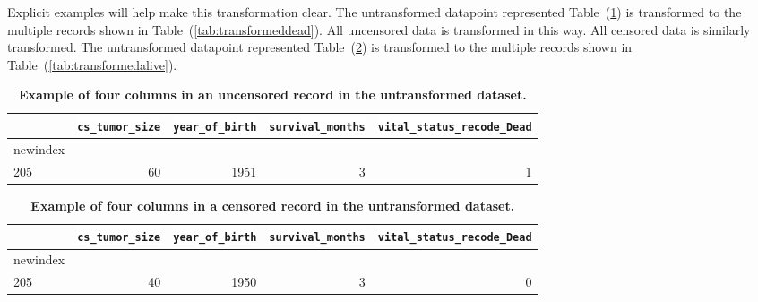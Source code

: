 \documentclass[10pt,letterpaper]{article}
\newcommand{\codewhite}[1]{\colorbox{white}{\texttt{#1}}}
\begin{document}
Explicit examples will help make this transformation clear.
The untransformed datapoint represented Table~(\ref{tab:originaldead}) is transformed to the multiple records shown in Table~(\ref{tab:transformeddead}). All uncensored data is transformed in this way. All censored data is similarly transformed. 
The untransformed datapoint represented Table~(\ref{tab:originalalive}) is transformed to the multiple records shown in Table~(\ref{tab:transformedalive}).



\begin{table}[!ht]
\begin{adjustwidth}{-2.25in}{0in} %
\caption{\label{tab:originaldead} {\bf Example of four columns in an uncensored record in the untransformed dataset.}}
\begin{tabular}{lrrrr}
\toprule
{} &  \codewhite{cs\_tumor\_size} &  \codewhite{year\_of\_birth} &  \codewhite{survival\_months} &  \codewhite{vital\_status\_recode\_Dead} \\
\midrule
newindex &                &                &        &            \\
205      &             60 &           1951 &      3 &          1 \\
\bottomrule
\end{tabular}
\end{adjustwidth}
\end{table}



\begin{table}[!ht]
\begin{adjustwidth}{-2.25in}{0in} %
\caption{\label{tab:originalalive} {\bf Example of four columns in a censored record in the untransformed dataset.}}
\begin{tabular}{lrrrr}
\toprule
{} &  \codewhite{cs\_tumor\_size} &  \codewhite{year\_of\_birth} &  \codewhite{survival\_months} &  \codewhite{vital\_status\_recode\_Dead} \\
\midrule
newindex &                &                &        &            \\
205      &             40 &           1950 &      3 &          0 \\
\bottomrule
\end{tabular}
\end{adjustwidth}
\end{table}
\end{document}

